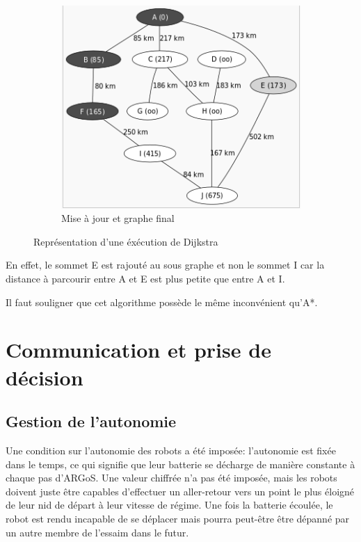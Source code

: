 \documentclass[a4paper,12pt]{report}
\begin{document}
\begin{figure}[h!]
        \begin{subfigure}[h!]{0.4\textwidth}
                \includegraphics[width=\textwidth]{dijk3.png}
                \caption{Mise à jour et graphe final}
        \end{subfigure}
        \caption{\label{fig:dijkstra}Représentation d'une éxécution de Dijkstra \cite{wikiDijkstra}}
\end{figure}


En effet, le sommet E est rajouté au sous graphe et non le sommet I car la distance à parcourir entre A et E est plus petite que entre A et I.

Il faut souligner que cet algorithme possède le même inconvénient qu'A*. 

\chapter{Communication et prise de décision}

\section{Gestion de l'autonomie}
Une condition sur l'autonomie des robots a été imposée: l'autonomie est fixée dans le temps, ce qui signifie que leur batterie se décharge de manière constante à chaque pas d'ARGoS. Une valeur chiffrée n'a pas été imposée, mais les robots doivent juste être capables d'effectuer un aller-retour vers un point le plus éloigné de leur nid de départ à leur vitesse de régime. Une fois la batterie écoulée, le robot est rendu incapable de se déplacer mais pourra peut-être être dépanné par un autre membre de l'essaim dans le futur.
\end{document}
